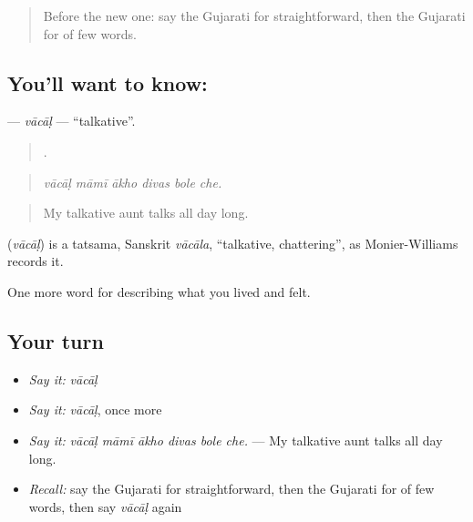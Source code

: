 \label{lesson:GU-C463-vacal}



\begin{quote}
Before the new one: say the Gujarati for straightforward, then the Gujarati for of few words.
\end{quote}

\subsection*{You'll want to know: }
\textbf{} — \emph{vācāḷ} — \textquotedblleft{}talkative\textquotedblright{}.

\begin{quote}
     .
\end{quote}

\begin{quote}
\emph{vācāḷ māmī ākho divas bole che.}
\end{quote}

\begin{quote}
My talkative aunt talks all day long.
\end{quote}

\begin{cousinweb}
\textbf{} (\emph{vācāḷ}) is a tatsama, Sanskrit \emph{vācāla}, \textquotedblleft{}talkative, chattering\textquotedblright{}, as Monier-Williams records it.
\end{cousinweb}

\begin{grammarlens}[title={What you've built}]
One more word for describing what you lived and felt.
\end{grammarlens}

\subsection*{Your turn}
\begin{itemize}
\raggedright
  \item \emph{Say it:} \emph{vācāḷ}
  \item \emph{Say it:} \emph{vācāḷ}, once more
  \item \emph{Say it:} \emph{vācāḷ māmī ākho divas bole che.} — My talkative aunt talks all day long.
  \item \emph{Recall:} say the Gujarati for straightforward, then the Gujarati for of few words, then say \emph{vācāḷ} again
\end{itemize}

